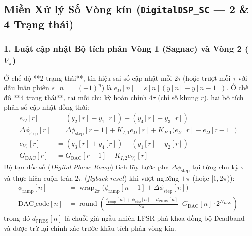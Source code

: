 \documentclass[11pt, a4paper]{article}
\begin{document}
\subsection{Miền Xử lý Số Vòng kín (\texttt{DigitalDSP\_SC} --- 2 \& 4 Trạng thái)}

\subsubsection*{1. Luật cập nhật Bộ tích phân Vòng 1 (Sagnac) và Vòng 2 ($V_\pi$)}
Ở chế độ **2 trạng thái**, tín hiệu sai số cập nhật mỗi $2\tau$ (hoặc trượt mỗi $\tau$ với dấu luân phiên $s[n] = (-1)^n$) là $e_\Omega[n] = s[n](y[n] - y[n-1])$. Ở chế độ **4 trạng thái**, tại mỗi chu kỳ hoàn chỉnh $4\tau$ (chỉ số khung $r$), hai bộ tích phân số cập nhật đồng thời:
\begin{align}
e_\Omega[r] &= (y_2[r] - y_1[r]) + (y_4[r] - y_3[r]) \\
\Delta\phi_{\text{step}}[r] &= \Delta\phi_{\text{step}}[r-1] + K_{I,1} e_\Omega[r] + K_{P,1}\bigl(e_\Omega[r] - e_\Omega[r-1]\bigr) \\
e_{V_\pi}[r] &= (y_3[r] + y_4[r]) - (y_1[r] + y_2[r]) \\
G_{\text{DAC}}[r] &= G_{\text{DAC}}[r-1] - K_{I,2} e_{V_\pi}[r]
\end{align}
Bộ tạo dốc số (\emph{Digital Phase Ramp}) tích lũy bước pha $\Delta\phi_{\text{step}}$ tại từng chu kỳ $\tau$ và thực hiện cuộn tràn $2\pi$ (\emph{flyback reset}) khi vượt ngưỡng $\pm\pi$ (hoặc $[0, 2\pi)$):
\begin{align}
\phi_{\text{ramp}}[n] &= \operatorname{wrap}_{2\pi}\!\bigl(\phi_{\text{ramp}}[n-1] + \Delta\phi_{\text{step}}[n]\bigr) \\
\text{DAC\_code}[n] &= \operatorname{round}\!\left(\frac{\phi_{\text{ramp}}[n] + \phi_{\text{bias}}[n] + d_{\text{PRBS}}[n]}{2\pi} \cdot G_{\text{DAC}}[n] \cdot 2^{N_{\text{DAC}}}\right)
\end{align}
trong đó $d_{\text{PRBS}}[n]$ là chuỗi giả ngẫu nhiên LFSR phá khóa đồng bộ Deadband và được trừ lại chính xác trước khâu tích phân vòng kín.
\end{document}
